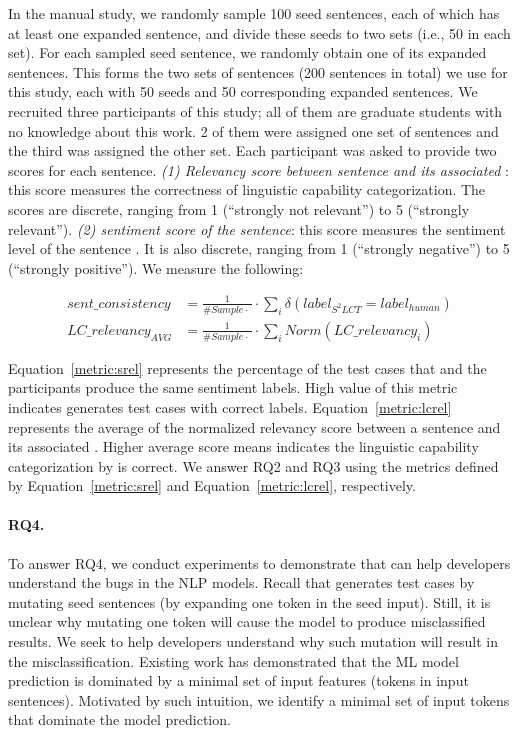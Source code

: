 In the manual study, we randomly sample 100 seed sentences, each of which has at least one expanded sentence, and divide these seeds to two sets (i.e., 50 in each set). For each sampled seed sentence, we randomly obtain one of its expanded sentences.
This forms the two sets of sentences (200 sentences in total) we use for this study, each with 50 seeds and 50 corresponding expanded sentences.
We recruited three participants of this study; all of them are graduate students with no knowledge about this work. 
2 of them were assigned one set of sentences and the third was assigned the other set.
Each participant was asked to provide two scores for each sentence.
\emph{(1) Relevancy score between sentence and its associated \lc}:
this score measures the correctness of \tool linguistic capability categorization.  The scores are discrete,
ranging from 1 (``strongly not relevant'') to 5 (``strongly relevant''). \emph{(2) sentiment score of the sentence}: this score measures the sentiment level of the sentence . It
is also discrete, ranging from 1 (``strongly
negative'') to 5 (``strongly positive''). 
We measure the following:

\begin{eqnarray}
  sent\_consistency &= \frac{1}{\#Sample\cdot~}\cdot \sum_{i} \delta(label_{S^2LCT}=label_{human}) \label{metric:srel} \\
  LC\_relevancy_{AVG} &= \frac{1}{\#Sample\cdot~}\cdot\sum_{i} Norm(LC\_relevancy_i) \label{metric:lcrel}
\end{eqnarray}

Equation~\ref{metric:srel} represents the percentage of the test cases that \tool and the participants produce the same sentiment labels. High value of this metric indicates \tool generates test cases with correct labels. Equation~\ref{metric:lcrel} represents the average of the
normalized relevancy score between a sentence and its associated
\lc. Higher average score means indicates the linguistic capability categorization by \tool is correct. We answer RQ2 and RQ3 using the metrics defined by
Equation~\ref{metric:srel} and Equation~\ref{metric:lcrel},
respectively.

\paragraph{\textbf{RQ4.}} 

To answer RQ4, we conduct experiments to demonstrate that \tool can help developers understand the bugs in the NLP models.
Recall that \tool generates test cases by mutating seed sentences (\eg by expanding one token in the seed input). Still, it is unclear why mutating one token will cause the model to produce misclassified results.
We seek to help developers understand why such mutation will result in the misclassification. 
Existing work \cite{simin2020denas, lemna, lime} has demonstrated that the ML model prediction is dominated by a minimal set of input features (\ie tokens in input sentences). Motivated by such intuition, we identify a minimal set of input tokens that dominate the model prediction.

